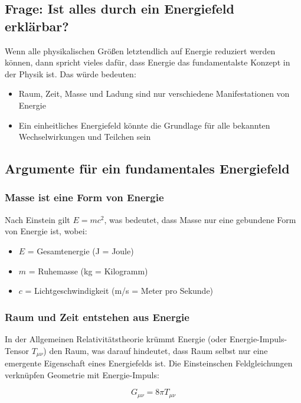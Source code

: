 \documentclass[12pt,a4paper]{article}
\begin{document}
	\subsection{Frage: Ist alles durch ein Energiefeld erklärbar?}
	
	Wenn alle physikalischen Größen letztendlich auf Energie reduziert werden können, dann spricht vieles dafür, dass Energie das fundamentalste Konzept in der Physik ist. Das würde bedeuten:
	
	\begin{itemize}
		\item Raum, Zeit, Masse und Ladung sind nur verschiedene Manifestationen von Energie
		\item Ein einheitliches Energiefeld könnte die Grundlage für alle bekannten Wechselwirkungen und Teilchen sein
	\end{itemize}
	
	\subsection{Argumente für ein fundamentales Energiefeld}
	
	\subsubsection{Masse ist eine Form von Energie}
	Nach Einstein \cite{Einstein1905} gilt $E = mc^2$, was bedeutet, dass Masse nur eine gebundene Form von Energie ist, wobei:
	\begin{itemize}
		\item $E$ = Gesamtenergie (J = Joule)
		\item $m$ = Ruhemasse (kg = Kilogramm)
		\item $c$ = Lichtgeschwindigkeit (m/s = Meter pro Sekunde)
	\end{itemize}
	
	\subsubsection{Raum und Zeit entstehen aus Energie}
	In der Allgemeinen Relativitätstheorie krümmt Energie (oder Energie-Impuls-Tensor $T_{\mu\nu}$) den Raum, was darauf hindeutet, dass Raum selbst nur eine emergente Eigenschaft eines Energiefelds ist. Die Einsteinschen Feldgleichungen verknüpfen Geometrie mit Energie-Impuls:
	
	\begin{equation}
		G_{\mu\nu} = 8\pi T_{\mu\nu}
	\end{equation}
	
\end{document}
